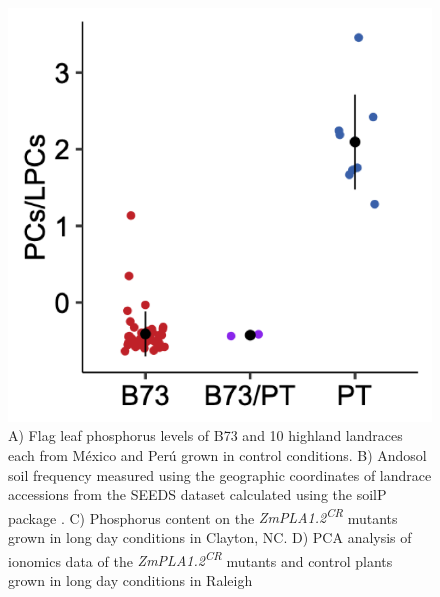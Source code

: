 \documentclass[9pt,twocolumn,twoside,lineno]{BioRxiv}
\begin{document}
\begin{figure}[t]
\begin{center}
\includegraphics[width=0.8\paperwidth]{Sup_Figures/Sup_Fig_8.png}
\caption{A) Flag leaf phosphorus levels of B73 and 10 highland landraces each from México and Perú grown in control conditions.
B) Andosol soil frequency measured using the geographic coordinates of landrace accessions from the SEEDS dataset calculated using the soilP package \cite{Rodriguez-Zapata2018-vz}.
C) Phosphorus content on the \textit{ZmPLA1.2\textsuperscript{CR}} mutants grown in long day conditions in Clayton, NC.
D) PCA analysis of ionomics data of the \textit{ZmPLA1.2\textsuperscript{CR}} mutants and control plants grown in long day conditions in Raleigh
}
\label{SupFig8}
\end{center}
\end{figure} 
\end{document}
